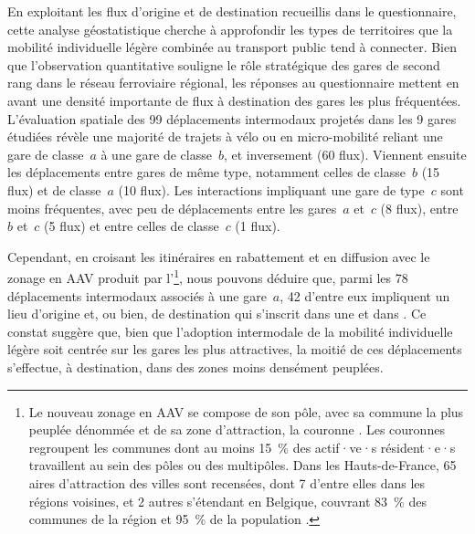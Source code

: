 \begin{refsegment}
En exploitant les flux d'origine et de destination recueillis dans le questionnaire, cette analyse géostatistique cherche à approfondir les types de territoires que la mobilité individuelle légère combinée au transport public tend à connecter. Bien que l'observation quantitative souligne le rôle stratégique des gares de second rang dans le réseau ferroviaire régional, les réponses au questionnaire mettent en avant une densité importante de flux à destination des gares les plus fréquentées. L'évaluation spatiale des 99 déplacements intermodaux projetés dans les 9 gares étudiées révèle une majorité de trajets à vélo ou en micro-mobilité reliant une gare de classe~\(a\) à une gare de classe~\(b\), et inversement (60 flux). Viennent ensuite les déplacements entre gares de même type, notamment celles de classe~\(b\) (15 flux) et de classe~\(a\) (10 flux). Les interactions impliquant une gare de type~\(c\) sont moins fréquentes, avec peu de déplacements entre les gares~\(a\) et~\(c\) (8 flux), entre~\(b\) et~\(c\) (5 flux) et entre celles de classe~\(c\) (1 flux).%

Cependant, en croisant les itinéraires en rabattement et en diffusion avec le zonage en \acrfull{AAV} produit par l'\textcolor{blue}{\textcite{insee_nouveau_2020}}\footnote{
    Le nouveau zonage en \acrfull{AAV} se compose de son pôle, avec sa commune la plus peuplée dénommée  et de sa zone d'attraction, la couronne \textcolor{blue}{\autocite{insee_nouveau_2020}}. Les couronnes regroupent les communes dont au moins 15~\% des actif·ve·s résident·e·s travaillent au sein des pôles ou des multipôles.
    Dans les Hauts-de-France, 65 aires d'attraction des villes sont recensées, dont 7 d'entre elles dans les régions voisines, et 2 autres s'étendant en Belgique, couvrant 83~\% des communes de la région et 95~\% de la population \textcolor{blue}{\autocite{insee_plus_2020}}.
}, nous pouvons déduire que, parmi les 78 déplacements intermodaux associés à une gare~\(a\), 42 d'entre eux impliquent un lieu d'origine et, ou bien, de destination qui s'inscrit dans une  et dans . Ce constat suggère que, bien que l'adoption intermodale de la mobilité individuelle légère soit centrée sur les gares les plus attractives, la moitié de ces déplacements s'effectue, à destination, dans des zones moins densément peuplées.%


\end{refsegment}
